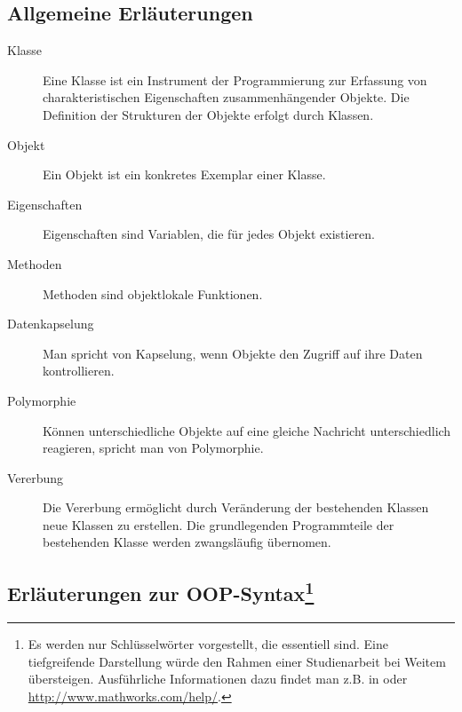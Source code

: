 \subsection*{Allgemeine Erl\"auterungen}
\begin{description}

	\item[Klasse] Eine Klasse ist ein Instrument der Programmierung zur
	Erfassung von charakteristischen Eigenschaften zusammenh\"angender
	Objekte. Die Definition der Strukturen der Objekte erfolgt durch
	Klassen.

	\item[Objekt] Ein Objekt ist ein konkretes Exemplar einer
	Klasse.

	\item[Eigenschaften] Eigenschaften sind Variablen, die f\"ur jedes
	Objekt existieren.

	\item[Methoden] Methoden sind objektlokale Funktionen.

	\item[Datenkapselung] Man spricht von Kapselung, wenn Objekte den
	Zugriff auf ihre Daten kontrollieren.

	\item[Polymorphie] K\"onnen unterschiedliche Objekte auf eine gleiche
	Nachricht unterschiedlich reagieren, spricht man von Polymorphie.

	\item[Vererbung] Die Vererbung erm\"oglicht durch Ver\"anderung der
	bestehenden Klassen neue Klassen zu erstellen. Die grundlegenden
	Programmteile der bestehenden Klasse werden zwangsl\"aufig
	\"ubernomen.

\end{description}


\subsection*{Erl\"auterungen zur OOP-Syntax\footnote{ Es werden nur
Schl\"usselw\"orter vorgestellt, die essentiell sind. Eine tiefgreifende
Darstellung w\"urde den Rahmen einer Studienarbeit bei Weitem \"ubersteigen.
Ausf\"uhrliche Informationen dazu findet man z.B. in \cite{matlab_kompakt} oder
\url{http://www.mathworks.com/help/}.}}

